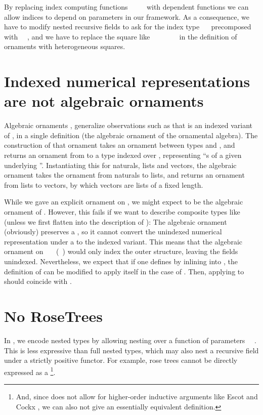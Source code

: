 By replacing index computing functions \ \AF{\&}\ \ \  with dependent functions
we can allow indices to depend on parameters in our framework. As a consequence, we have to modify nested recursive fields to ask for the index type \ \  precomposed with \ \ , and we have to replace the square like \ \ \ \ \ \ \  in the definition of ornaments with heterogeneous squares.


\section{Indexed numerical representations are not algebraic ornaments}\label{sec:ix-not-alg}
Algebraic ornaments \cite{algorn}, generalize observations such as that  is an indexed variant of , in a single definition  (the algebraic ornament of the ornamental algebra). The construction of that ornament takes an ornament between types  and , and returns an ornament from  to a type indexed over , representing ``s of a given underlying ''. Instantiating this for naturals, lists and vectors, the algebraic ornament takes the ornament from naturals to lists, and returns an ornament from lists to vectors, by which vectors are lists of a fixed length.

While we gave an explicit ornament  on , we might expect  to be the algebraic ornament of . However, this fails if we want to describe composite types like  (unless we first flatten  into the description of ): The algebraic ornament (obviously) preserves a , so it cannot convert the unindexed numerical representation under a  to the indexed variant. This means that the algebraic ornament on \ \AV{=}\ \ (\ ) would only index the outer structure, leaving the  fields unindexed.
Nevertheless, we expect that if one defines  by inlining  into , the definition of  can be modified to apply itself in the case of . Then, applying  to  should coincide with .


\section{No RoseTrees}
In , we encode nested types by allowing nesting over a function of parameters \ \ . This is less expressive than full nested types, which may also nest a recursive field under a strictly positive functor. For example, rose trees
cannot be directly expressed as a \footnote{And, since  does not allow for higher-order inductive arguments like Escot and Cockx \cite{practgen}, we can also not give an essentially equivalent definition.}.

